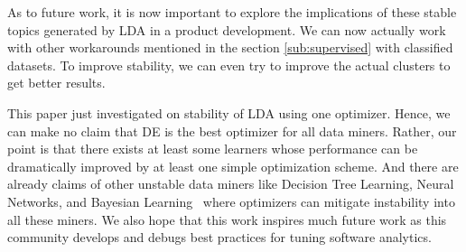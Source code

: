\documentclass[conference]{IEEEtran}
\theoremstyle{break}
\begin{document}
As to future work, it is now important to explore the implications of these stable topics generated by LDA in a product development. We can now actually work with other workarounds mentioned in the section \ref{sub:supervised} with classified datasets. To improve stability, we can even try to improve the actual clusters to get better results.

This paper just investigated on stability of LDA using one optimizer. Hence, we can make no claim that DE is the best optimizer for all data miners. Rather, our point is that there exists at least some learners whose performance can be dramatically improved by at least one simple optimization scheme. And there are already claims of other unstable data miners like Decision Tree Learning, Neural Networks, and Bayesian Learning~\cite{zhang2005machine} where optimizers can mitigate instability into all these miners. We also hope that this work inspires much future work as this community develops and debugs best practices for tuning software analytics.



\medskip



\end{document}
